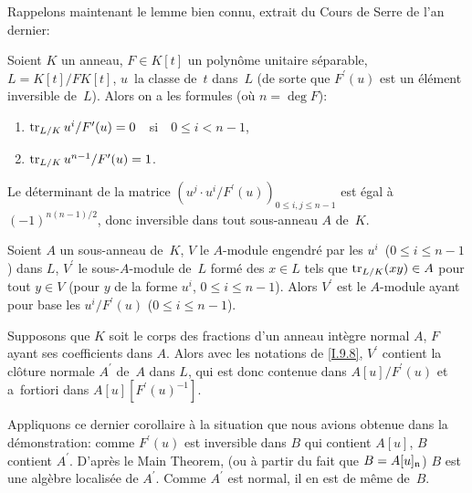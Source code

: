Rappelons maintenant le lemme bien connu, extrait du Cours de Serre de
l'an dernier:

\begin{lemme}
\label{I.9.6}
Soient $K$ un anneau, $F\in K[t]$ un polyn\^ome unitaire
s\'eparable, $L=K[t]/FK[t]$, $u$~la classe de~$t$ dans~$L$ (de sorte
que $F^\prime(u)$ est un \'el\'ement inversible de~$L$). Alors on
a les formules (o\`u $n=\deg{F}$):
\begin{enumerate}
\item[]$\operatorname{tr}_{L/K} u^i/F^\prime(u)=0$\ \ si\ \
$0\le i< n-1$,
\item[]$\operatorname{tr}_{L/K} u^{n-1}/F^\prime(u)=1$.
\end{enumerate}
\end{lemme}

\begin{corollaire}
\label{I.9.7}
Le d\'eterminant de la matrice $(u^j\cdot u^i/F^\prime(u))_{0\le i,j\le
n-1}$ est \'egal \`a
$(-1)^{n(n-1)/2}$,
donc inversible dans tout
sous-anneau $A$ de~$K$.
\end{corollaire}

\begin{corollaire}
\label{I.9.8}
Soient
$A$ un sous-anneau de~$K$, $V$ le $A$-module engendr\'e par les
$u^i$~($0\le i\le n-1$) dans $L$, $V^\prime$ le sous-$A$-module de~$L$
form\'e des $x\in L$ tels que $\operatorname{tr}_{L/K}(xy)\in A$ pour tout
$y\in V$ (\ie pour $y$ de la forme $u^i$, $0\le i\le n-1$). Alors
$V^\prime$ est le $A$-module ayant pour base les $u^i/F^\prime(u)$
($0\le i\le n-1$).
\end{corollaire}

\begin{corollaire}
\label{I.9.9}
Supposons que $K$ soit le corps des fractions d'un anneau int\`egre
normal $A$, $F$ ayant ses coefficients dans $A$. Alors avec les
notations de \ref{I.9.8}, $V^\prime$ contient la cl\^oture normale
$A^\prime$ de~$A$ dans $L$, qui est donc contenue dans
$A[u]/F^\prime(u)$ et a~fortiori dans $A[u][F^\prime(u)^{-1}]$.
\end{corollaire}

Appliquons ce dernier corollaire \`a la situation que nous avions
obtenue dans la d\'e\-mon\-stra\-tion: comme $F^\prime(u)$ est
inversible dans $B$ qui contient $A[u]$, $B$ contient $A^\prime$.
D'apr\`es le Main Theorem, (ou \`a partir du fait que
$B=A[u]_{\mathfrak{n}}$) $B$ est une alg\`ebre localis\'ee de
$A^\prime$. Comme $A^\prime$ est normal, il en est de m\^eme
de~$B$.


